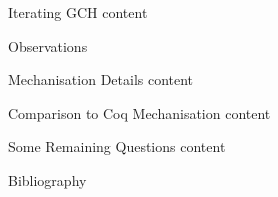 \documentclass[xcolor=dvipsnames,compress,aspectratio=169,handout]{beamer}
\begin{document}
\begin{frame}{Iterating GCH}
	content
\end{frame}

\begin{frame}
	\Huge
	\centering
	Observations
\end{frame}

\begin{frame}{Mechanisation Details}
	content
\end{frame}

\begin{frame}{Comparison to Coq Mechanisation}
	content
\end{frame}

\begin{frame}{Some Remaining Questions}
	content
\end{frame}



\begin{frame}{Bibliography}
\small


\end{frame}
\end{document}
